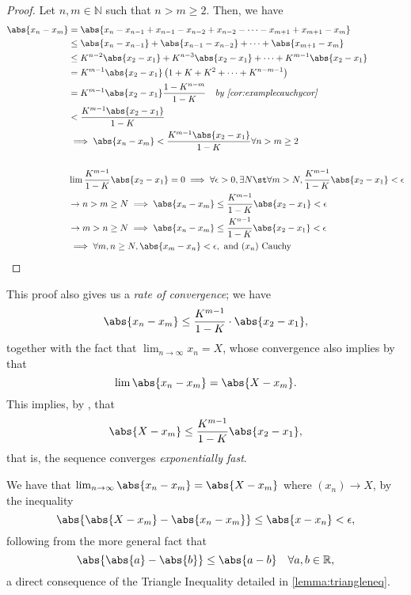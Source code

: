 \documentclass[12pt]{article}
\begin{document}
\begin{proof}
  Let $n,m \in \mathbb{N}$ such that $n > m \geq 2$. Then, we have \begin{align*}
    \abs{x_n - x_m} &= \abs{x_n - x_{n-1} + x_{n-1} - x_{n-2} +x_{n-2} - \cdots  - x_{m+1} + x_{m+1} - x_m}\\
    &\leq \abs{x_n - x_{n-1}} + \abs{x_{n-1} - x_{n-2}} + \cdots + \abs{x_{m+1} - x_m}\\
    &\leq K^{n-2} \abs{x_2 - x_1} + K^{n-3} \abs{x_2 -x_1} + \cdots + K^{m-1} \abs{x_2 - x_1}\\
    &= K^{m-1}\abs{x_2 - x_1} \left(1 + K + K^2 + \cdots + K^{n-m-1}\right)\\
    &= K^{m-1}\abs{x_2 - x_1} \frac{1-K^{n-m}}{1-K} \quad \textit{by \cref{cor:examplecauchycor}}\\
    &< \frac{K^{m-1}\abs{x_2 - x_1}}{1-K}\\
   &\implies \abs{x_n - x_m} < \frac{K^{m-1}\abs{x_2 - x_1}}{1 - K} \forall n > m \geq 2\\\\
   &\lim \frac{K^{m-1}}{1-K}\abs{x_2 - x_1} = 0 \implies \forall \epsilon > 0, \exists N \st \forall m > N, \frac{K^{m-1}}{1-K}\abs{x_2 - x_1} < \epsilon\\
    & \rightarrow n > m \geq N \implies \abs{x_n - x_m} \leq \frac{K^{m-1}}{1-K} \abs{x_2 - x_1} < \epsilon\\
    & \rightarrow m > n \geq N \implies \abs{x_n - x_m} \leq \frac{K^{n-1}}{1-K} \abs{x_2 - x_1} < \epsilon\\
    &\implies \forall m, n \geq N, \abs{x_m - x_n} < \epsilon, \text{ and } (x_n) \text{ Cauchy}
  \end{align*}
\end{proof}
\begin{remark}
  This proof also gives us a \emph{rate of convergence}; we have
  \[\abs{x_n - x_m} \leq \frac{K^{m-1}}{1-K} \cdot \abs{x_2 - x_1},\] together with the fact that $\lim_{n\to\infty} x_n = X$, whose convergence also implies by  that \[\lim \abs{x_n - x_m} = \abs{X - x_m}.\] This implies, by , that \[
  \abs{X - x_m} \leq \frac{K^{m-1}}{1-K} \abs{x_2 - x_1},
  \]
  that is, the sequence converges \emph{exponentially fast}.
\end{remark}

\begin{remark}
  We have that $\lim_{n\to\infty} \abs{x_n - x_m} = \abs{X - x_m}$ where $(x_n) \to X$, by the inequality \[
    \abs{\abs{X - x_m} - \abs{x_n - x_m}}   \leq \abs{x - x_n} < \epsilon,
  \]
  following from the more general fact that \[
  \abs{\abs{a} - \abs{b}} \leq \abs{a - b} \quad \forall a,b \in \mathbb{R},
  \]
  a direct consequence of the Triangle Inequality detailed in \cref{lemma:triangleneq}.
\end{remark}
\end{document}
